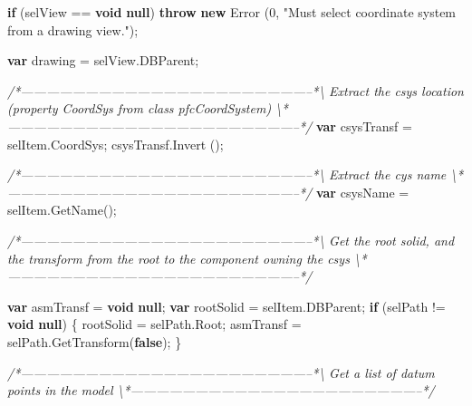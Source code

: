\documentclass[]{article}
\newenvironment{Shaded}{}{}
\newcommand{\KeywordTok}[1]{\textcolor[rgb]{0.00,0.44,0.13}{\textbf{{#1}}}}
\newcommand{\DecValTok}[1]{\textcolor[rgb]{0.25,0.63,0.44}{{#1}}}
\newcommand{\StringTok}[1]{\textcolor[rgb]{0.25,0.44,0.63}{{#1}}}
\newcommand{\CommentTok}[1]{\textcolor[rgb]{0.38,0.63,0.69}{\textit{{#1}}}}
\newcommand{\OtherTok}[1]{\textcolor[rgb]{0.00,0.44,0.13}{{#1}}}
\newcommand{\FunctionTok}[1]{\textcolor[rgb]{0.02,0.16,0.49}{{#1}}}
\newcommand{\NormalTok}[1]{{#1}}
\begin{document}
\begin{Shaded}
\begin{Highlighting}[]
  \KeywordTok{if} \NormalTok{(selView == }\KeywordTok{void} \KeywordTok{null}\NormalTok{)}
    \KeywordTok{throw} \KeywordTok{new} \FunctionTok{Error} \NormalTok{(}\DecValTok{0}\NormalTok{, }\StringTok{"Must select coordinate system from a drawing view."}\NormalTok{);}
  
  \KeywordTok{var} \NormalTok{drawing = }\OtherTok{selView}\NormalTok{.}\FunctionTok{DBParent}\NormalTok{;}
 
\CommentTok{/*--------------------------------------------------------------------*\textbackslash{}    }
\CommentTok{  Extract the csys location (property CoordSys from class pfcCoordSystem)}
\CommentTok{\textbackslash{}*--------------------------------------------------------------------*/}
  \KeywordTok{var} \NormalTok{csysTransf = }\OtherTok{selItem}\NormalTok{.}\FunctionTok{CoordSys}\NormalTok{;}
  \OtherTok{csysTransf}\NormalTok{.}\FunctionTok{Invert} \NormalTok{();}
  
\CommentTok{/*--------------------------------------------------------------------*\textbackslash{}    }
\CommentTok{  Extract the cys name}
\CommentTok{\textbackslash{}*--------------------------------------------------------------------*/}
  \KeywordTok{var} \NormalTok{csysName = }\OtherTok{selItem}\NormalTok{.}\FunctionTok{GetName}\NormalTok{();    }
 
\CommentTok{/*--------------------------------------------------------------------*\textbackslash{}    }
\CommentTok{  Get the root solid, and the transform from the root to the}
\CommentTok{  component owning the csys}
\CommentTok{\textbackslash{}*--------------------------------------------------------------------*/}
  
  \KeywordTok{var} \NormalTok{asmTransf = }\KeywordTok{void} \KeywordTok{null}\NormalTok{;}
  \KeywordTok{var} \NormalTok{rootSolid = }\OtherTok{selItem}\NormalTok{.}\FunctionTok{DBParent}\NormalTok{;}
  \KeywordTok{if} \NormalTok{(selPath != }\KeywordTok{void} \KeywordTok{null}\NormalTok{)}
    \NormalTok{\{}
      \NormalTok{rootSolid = }\OtherTok{selPath}\NormalTok{.}\FunctionTok{Root}\NormalTok{;}
      \NormalTok{asmTransf = }\OtherTok{selPath}\NormalTok{.}\FunctionTok{GetTransform}\NormalTok{(}\KeywordTok{false}\NormalTok{);   }
    \NormalTok{\}}

\CommentTok{/*--------------------------------------------------------------------*\textbackslash{} }
\CommentTok{  Get a list of datum points in the model}
\CommentTok{\textbackslash{}*--------------------------------------------------------------------*/}
  

\end{Highlighting}
\end{Shaded}
\end{document}
